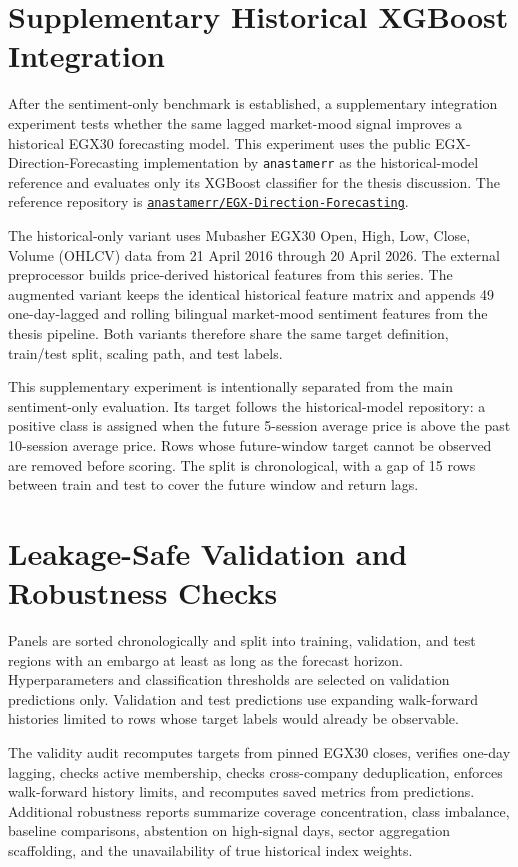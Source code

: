 \section{Supplementary Historical XGBoost Integration}

After the sentiment-only benchmark is established, a supplementary integration experiment tests whether the same lagged market-mood signal improves a historical EGX30 forecasting model. This experiment uses the public EGX-Direction-Forecasting implementation by \texttt{anastamerr} as the historical-model reference and evaluates only its XGBoost classifier for the thesis discussion. The reference repository is \href{https://github.com/anastamerr/EGX-Direction-Forecasting}{\texttt{anastamerr/EGX-Direction-Forecasting}}.

The historical-only variant uses Mubasher EGX30 Open, High, Low, Close, Volume (OHLCV) data from 21 April 2016 through 20 April 2026. The external preprocessor builds price-derived historical features from this series. The augmented variant keeps the identical historical feature matrix and appends 49 one-day-lagged and rolling bilingual market-mood sentiment features from the thesis pipeline. Both variants therefore share the same target definition, train/test split, scaling path, and test labels.

This supplementary experiment is intentionally separated from the main sentiment-only evaluation. Its target follows the historical-model repository: a positive class is assigned when the future 5-session average price is above the past 10-session average price. Rows whose future-window target cannot be observed are removed before scoring. The split is chronological, with a gap of 15 rows between train and test to cover the future window and return lags.

\section{Leakage-Safe Validation and Robustness Checks}

Panels are sorted chronologically and split into training, validation, and test regions with an embargo at least as long as the forecast horizon. Hyperparameters and classification thresholds are selected on validation predictions only. Validation and test predictions use expanding walk-forward histories limited to rows whose target labels would already be observable.

The validity audit recomputes targets from pinned EGX30 closes, verifies one-day lagging, checks active membership, checks cross-company deduplication, enforces walk-forward history limits, and recomputes saved metrics from predictions. Additional robustness reports summarize coverage concentration, class imbalance, baseline comparisons, abstention on high-signal days, sector aggregation scaffolding, and the unavailability of true historical index weights.

